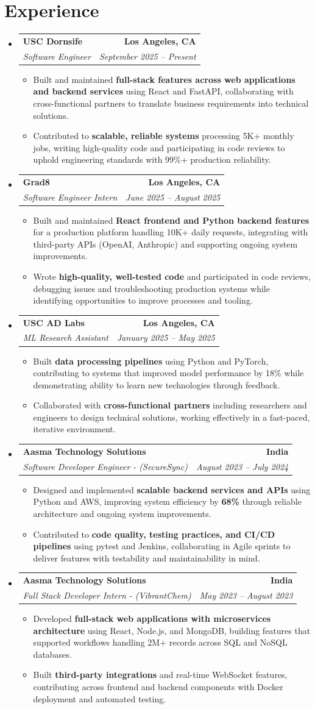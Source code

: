 \documentclass[letterpaper,10pt]{article}
\makeatletter
\newcommand{\resumeItem}[1]{\item\small{{#1 \vspace{-2pt}}}}
\newcommand{\resumeSubheading}[4]{\vspace{-1pt}\item\begin{tabular*}{1.0\textwidth}[t]{l@{\extracolsep{\fill}}r}\textbf{#1} & \textbf{\small #2} \\\textit{\small#3} & \textit{\small #4} \\\end{tabular*}\vspace{-2pt}}
\newcommand{\resumeSubHeadingListStart}{\begin{itemize}[leftmargin=0.0in, label={}]}
\newcommand{\resumeSubHeadingListEnd}{\end{itemize}}
\newcommand{\resumeItemListStart}{\begin{itemize}[leftmargin=0.15in,label=\textbullet,itemsep=2pt,topsep=0pt,parsep=0pt,partopsep=0pt]}
\newcommand{\resumeItemListEnd}{\end{itemize}\vspace{-4pt}}
\makeatother
\begin{document}
\section{Experience}
\resumeSubHeadingListStart
\resumeSubheading{USC Dornsife}{Los Angeles, CA}{Software Engineer}{September 2025 -- Present}
\resumeItemListStart
\resumeItem{Built and maintained \textbf{full-stack features across web applications and backend services} using React and FastAPI, collaborating with cross-functional partners to translate business requirements into technical solutions.}
\resumeItem{Contributed to \textbf{scalable, reliable systems} processing 5K+ monthly jobs, writing high-quality code and participating in code reviews to uphold engineering standards with 99\%+ production reliability.}
\resumeItemListEnd
\resumeSubheading{Grad8}{Los Angeles, CA}{Software Engineer Intern}{June 2025 -- August 2025}
\resumeItemListStart
\resumeItem{Built and maintained \textbf{React frontend and Python backend features} for a production platform handling 10K+ daily requests, integrating with third-party APIs (OpenAI, Anthropic) and supporting ongoing system improvements.}
\resumeItem{Wrote \textbf{high-quality, well-tested code} and participated in code reviews, debugging issues and troubleshooting production systems while identifying opportunities to improve processes and tooling.}
\resumeItemListEnd
\resumeSubheading{USC AD Labs}{Los Angeles, CA}{ML Research Assistant}{January 2025 -- May 2025}
\resumeItemListStart
\resumeItem{Built \textbf{data processing pipelines} using Python and PyTorch, contributing to systems that improved model performance by 18\% while demonstrating ability to learn new technologies through feedback.}
\resumeItem{Collaborated with \textbf{cross-functional partners} including researchers and engineers to design technical solutions, working effectively in a fast-paced, iterative environment.}
\resumeItemListEnd
\resumeSubheading{Aasma Technology Solutions}{India}{Software Developer Engineer - (SecureSync)}{August 2023 -- July 2024}
\resumeItemListStart
\resumeItem{Designed and implemented \textbf{scalable backend services and APIs} using Python and AWS, improving system efficiency by \textbf{68\%} through reliable architecture and ongoing system improvements.}
\resumeItem{Contributed to \textbf{code quality, testing practices, and CI/CD pipelines} using pytest and Jenkins, collaborating in Agile sprints to deliver features with testability and maintainability in mind.}
\resumeItemListEnd
\resumeSubheading{Aasma Technology Solutions}{India}{Full Stack Developer Intern - (VibrantChem)}{May 2023 -- August 2023}
\resumeItemListStart
\resumeItem{Developed \textbf{full-stack web applications with microservices architecture} using React, Node.js, and MongoDB, building features that supported workflows handling 2M+ records across SQL and NoSQL databases.}
\resumeItem{Built \textbf{third-party integrations} and real-time WebSocket features, contributing across frontend and backend components with Docker deployment and automated testing.}
\resumeItemListEnd
\resumeSubHeadingListEnd
\vspace{-14pt}
\end{document}
